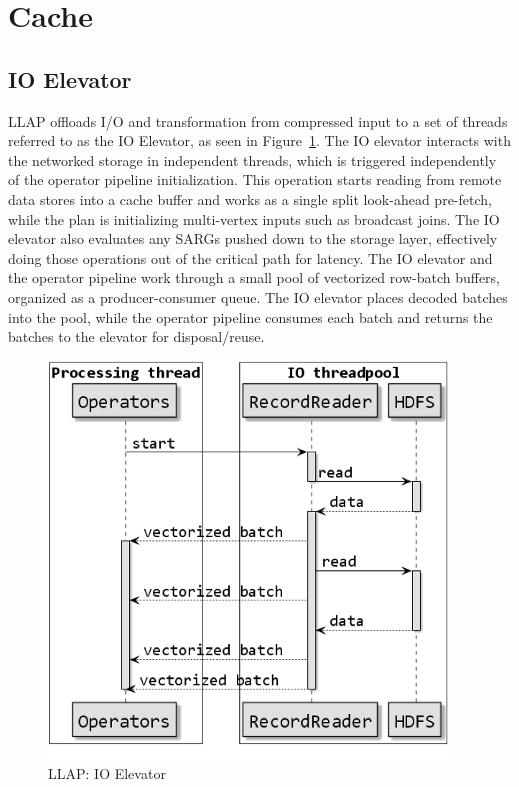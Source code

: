 \section{Cache}

\subsection{IO Elevator}

LLAP offloads I/O and transformation from compressed input to a set of threads referred to as the IO Elevator, as seen in Figure~\ref{fig:elevator}.
The IO elevator interacts with the networked storage in independent threads, which is triggered independently
of the operator pipeline initialization.  This operation starts reading from remote data stores into a cache 
buffer and works as a single split look-ahead pre-fetch, while the plan is initializing multi-vertex inputs
such as broadcast joins.
The 
IO elevator also evaluates any SARGs pushed down to the storage layer, effectively doing those operations 
out of the critical path for latency.
The IO elevator and the operator pipeline work through a small pool of vectorized row-batch buffers, organized
as a producer-consumer queue. The IO elevator places decoded batches into the pool, while the operator pipeline
consumes each batch and returns the batches to the elevator for disposal/reuse.

\begin{figure}[H]
\centering
\includegraphics[width=0.8\columnwidth]{figures/elevator.png}
\caption{LLAP: IO Elevator}
\label{fig:elevator}
\end{figure} 

